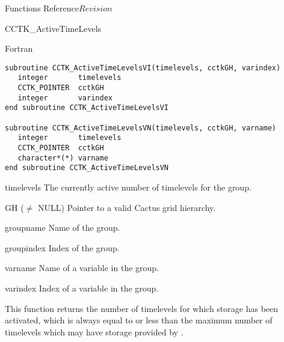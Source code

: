 \begin{cactuspart}{ Functions Reference}{}{$Revision$}
\begin{FunctionDescription}{CCTK\_ActiveTimeLevels}
\begin{SynopsisSection}
\begin{Synopsis}{Fortran}
\begin{verbatim}
subroutine CCTK_ActiveTimeLevelsVI(timelevels, cctkGH, varindex)
   integer       timelevels
   CCTK_POINTER  cctkGH
   integer       varindex
end subroutine CCTK_ActiveTimeLevelsVI

subroutine CCTK_ActiveTimeLevelsVN(timelevels, cctkGH, varname)
   integer       timelevels
   CCTK_POINTER  cctkGH
   character*(*) varname
end subroutine CCTK_ActiveTimeLevelsVN
\end{verbatim}
\end{Synopsis}
\end{SynopsisSection}

\begin{ResultSection}
\begin{Result}{timelevels}
The currently active number of timelevels for the group.
\end{Result}
\end{ResultSection}

\begin{ParameterSection}
\begin{Parameter}{GH ($\ne$ NULL)}
Pointer to a valid Cactus grid hierarchy.
\end{Parameter}
\begin{Parameter}{groupname}
Name of the group.
\end{Parameter}
\begin{Parameter}{groupindex}
Index of the group.
\end{Parameter}
\begin{Parameter}{varname}
Name of a variable in the group.
\end{Parameter}
\begin{Parameter}{varindex}
Index of a variable in the group.
\end{Parameter}
\end{ParameterSection}

\begin{Discussion}
This function returns the number of timelevels for which storage has
been activated, which is always equal to or less than the maximum
number of timelevels which may have storage provided by
.
\end{Discussion}


\end{FunctionDescription}
\end{cactuspart}
